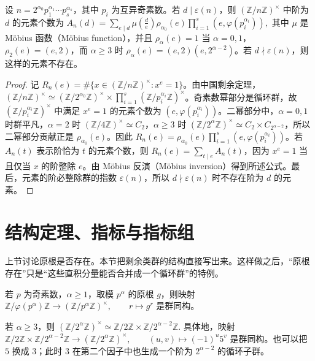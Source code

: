 \documentclass[oneside]{AJbook}
\newcommand{\Z}{\mathbb Z}
\newcommand{\U}[1]{(\Z/#1\Z)^\times}
\newcommand{\Cyc}[1]{\Z/#1\Z}
\begin{document}
\begin{theorem}[一般模数中给定阶的元素个数]
设 \(n=2^{\alpha_0}p_1^{\alpha_1}\cdots p_s^{\alpha_s}\)，其中 \(p_i\) 为互异奇素数。若 \(d\mid \varepsilon(n)\)，则 \(\U n\) 中阶为 \(d\) 的元素个数为
\(
A_n(d)=\sum_{e\mid d}\mu\!\left(\frac d e\right)\rho_{\alpha_0}(e)\prod_{i=1}^s (e,\varphi(p_i^{\alpha_i})),
\)
其中 \(\mu\) 是 Möbius 函数（Möbius function），并且 \(\rho_{\alpha}(e)=1\) 当 \(\alpha=0,1\)，\(\rho_2(e)=(e,2)\)，而 \(\alpha\ge3\) 时 \(\rho_{\alpha}(e)=(e,2)(e,2^{\alpha-2})\)。若 \(d\nmid\varepsilon(n)\)，则这样的元素不存在。
\end{theorem}

\begin{proof}
记 \(R_n(e)=\#\{x\in\U n:x^e=1\}\)。由中国剩余定理，\(\U n\simeq \U{2^{\alpha_0}}\times \prod_{i=1}^s\U{p_i^{\alpha_i}}\)。奇素数幂部分是循环群，故 \(\U{p_i^{\alpha_i}}\) 中满足 \(x^e=1\) 的元素个数为 \((e,\varphi(p_i^{\alpha_i}))\)。二幂部分中，\(\alpha=0,1\) 时群平凡，\(\alpha=2\) 时 \(\U4\simeq C_2\)，\(\alpha\ge3\) 时 \(\U{2^\alpha}\simeq C_2\times C_{2^{\alpha-2}}\)，所以二幂部分贡献正是 \(\rho_{\alpha_0}(e)\)。因此 \(R_n(e)=\rho_{\alpha_0}(e)\prod_{i=1}^s(e,\varphi(p_i^{\alpha_i}))\)。若 \(A_n(t)\) 表示阶恰为 \(t\) 的元素个数，则 \(R_n(e)=\sum_{t\mid e}A_n(t)\)，因为 \(x^e=1\) 当且仅当 \(x\) 的阶整除 \(e\)。由 Möbius 反演（Möbius inversion）得到所述公式。最后，元素的阶必整除群的指数 \(\varepsilon(n)\)，所以 \(d\nmid\varepsilon(n)\) 时不存在阶为 \(d\) 的元素。
\end{proof}

\section{结构定理、指标与指标组}

上节讨论原根是否存在。本节把剩余类群的结构直接写出来。这样做之后，“原根存在”只是“这些直积分量能否合并成一个循环群”的特例。

\begin{theorem}[奇素数幂模单位群]
若 $p$ 为奇素数，$\alpha\ge 1$，取模 $p^\alpha$ 的原根 $g$，则映射
\(
  \Cyc{\varphi(p^\alpha)}
  \longrightarrow
  \U{p^\alpha},\qquad
  r\longmapsto g^r
\)
是群同构。
\end{theorem}

\begin{theorem}[二的幂模单位群]
若 $\alpha\ge 3$，则
\(
  \U{2^\alpha}\simeq \Cyc2\times \Cyc{2^{\alpha-2}}.
\)
具体地，映射
\(
  \Cyc2\times \Cyc{2^{\alpha-2}}
  \longrightarrow
  \U{2^\alpha},\qquad
  (u,v)\longmapsto (-1)^u5^v
\)
是群同构。也可以把 $5$ 换成 $3$；此时 $3$ 在第二个因子中也生成一个阶为 $2^{\alpha-2}$ 的循环子群。
\end{theorem}
\end{document}
